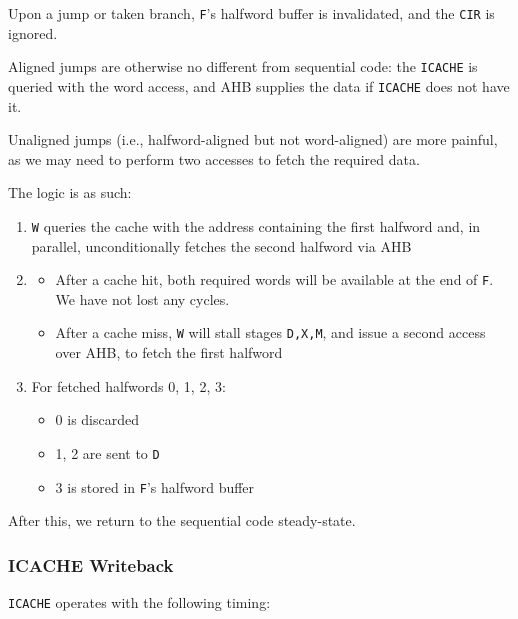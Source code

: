 \documentclass{article}
\begin{document}
Upon a jump or taken branch, \texttt{F}'s halfword buffer is invalidated, and the \texttt{CIR} is ignored.

Aligned jumps are otherwise no different from sequential code: the \texttt{ICACHE} is queried with the word access, and AHB supplies the data if \texttt{ICACHE} does not have it.

Unaligned jumps (i.e., halfword-aligned but not word-aligned) are more painful, as we may need to perform two accesses to fetch the required data.

The logic is as such:

\begin{enumerate}
\item \texttt{W} queries the cache with the address containing the first halfword and, in parallel, unconditionally fetches the second halfword via AHB
\item
	\begin{itemize}
	\item After a cache hit, both required words will be available at the end of \texttt{F}. We have not lost any cycles.
	\item After a cache miss, \texttt{W} will stall stages \texttt{D,X,M}, and issue a second access over AHB, to fetch the first halfword
	\end{itemize}
\item For fetched halfwords 0, 1, 2, 3:
	\begin{itemize}
	\item 0 is discarded
	\item 1, 2 are sent to \texttt{D}
	\item 3 is stored in \texttt{F}'s halfword buffer
	\end{itemize}
\end{enumerate}

After this, we return to the sequential code steady-state.

\subsubsection{ICACHE Writeback}

\texttt{ICACHE} operates with the following timing:
\end{document}
